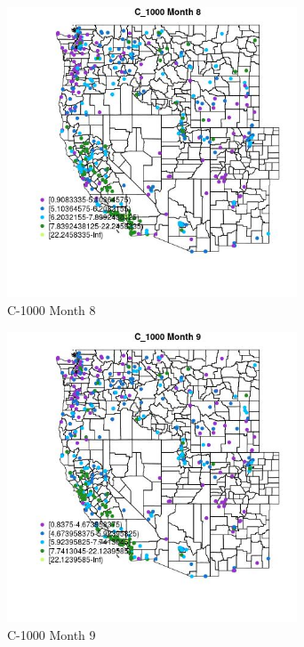 \clearpage 

\begin{figure} 
\centering  
\includegraphics[width=0.77\textwidth]{Code_Outputs/ML_input_report_ML_input_PM25_Step5_part_d_de_duplicated_aves_ML_input_MapObsMo8C_1000.jpg} 
\caption{\label{fig:ML_input_report_ML_input_PM25_Step5_part_d_de_duplicated_aves_ML_inputMapObsMo8C_1000}C-1000 Month 8} 
\end{figure} 
 

\begin{figure} 
\centering  
\includegraphics[width=0.77\textwidth]{Code_Outputs/ML_input_report_ML_input_PM25_Step5_part_d_de_duplicated_aves_ML_input_MapObsMo9C_1000.jpg} 
\caption{\label{fig:ML_input_report_ML_input_PM25_Step5_part_d_de_duplicated_aves_ML_inputMapObsMo9C_1000}C-1000 Month 9} 
\end{figure} 
 

